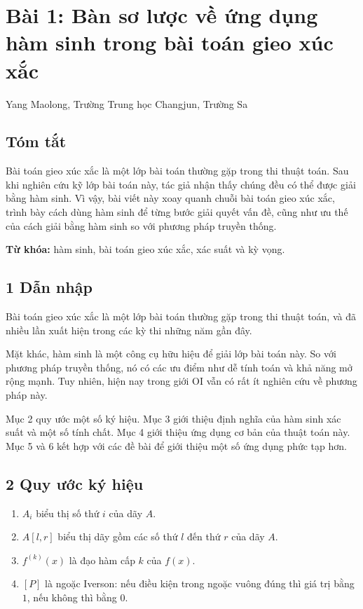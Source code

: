 \documentclass[11pt]{article}
\begin{document}
\section{Bài 1: Bàn sơ lược về ứng dụng hàm sinh trong bài toán gieo xúc xắc}

\begin{center}
Yang Maolong, Trường Trung học Changjun, Trường Sa
\end{center}

\subsection*{Tóm tắt}

Bài toán gieo xúc xắc là một lớp bài toán thường gặp trong thi thuật toán. Sau
khi nghiên cứu kỹ lớp bài toán này, tác giả nhận thấy chúng đều có thể được
giải bằng hàm sinh. Vì vậy, bài viết này xoay quanh chuỗi bài toán gieo xúc
xắc, trình bày cách dùng hàm sinh để từng bước giải quyết vấn đề, cũng như ưu
thế của cách giải bằng hàm sinh so với phương pháp truyền thống.

\noindent\textbf{Từ khóa:} hàm sinh, bài toán gieo xúc xắc, xác suất và kỳ vọng.

\subsection*{1 Dẫn nhập}

Bài toán gieo xúc xắc là một lớp bài toán thường gặp trong thi thuật toán, và
đã nhiều lần xuất hiện trong các kỳ thi những năm gần đây.

Mặt khác, hàm sinh là một công cụ hữu hiệu để giải lớp bài toán này. So với
phương pháp truyền thống, nó có các ưu điểm như dễ tính toán và khả năng mở
rộng mạnh. Tuy nhiên, hiện nay trong giới OI vẫn có rất ít nghiên cứu về phương
pháp này.

Mục 2 quy ước một số ký hiệu. Mục 3 giới thiệu định nghĩa của hàm sinh xác
suất và một số tính chất. Mục 4 giới thiệu ứng dụng cơ bản của thuật toán này.
Mục 5 và 6 kết hợp với các đề bài để giới thiệu một số ứng dụng phức tạp hơn.

\subsection*{2 Quy ước ký hiệu}

\begin{enumerate}
  \item \(A_i\) biểu thị số thứ \(i\) của dãy \(A\).
  \item \(A[l,r]\) biểu thị dãy gồm các số thứ \(l\) đến thứ \(r\) của dãy
  \(A\).
  \item \(f^{(k)}(x)\) là đạo hàm cấp \(k\) của \(f(x)\).
  \item \([P]\) là ngoặc Iverson: nếu điều kiện trong ngoặc vuông đúng thì giá
  trị bằng \(1\), nếu không thì bằng \(0\).
\end{enumerate}
\end{document}
